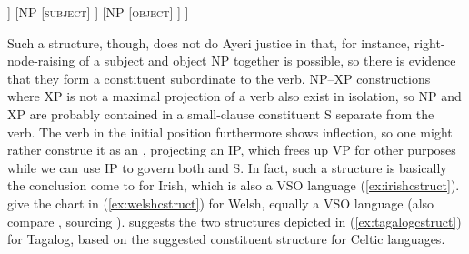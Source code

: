 \ex\label{ex:ayrtreefirsthypo}\ljudge\ques
\begin{forest}
[S
	[V
		[\textsc{verb}]
	]
	[NP
		[\textsc{subject}]
	]
	[NP
		[\textsc{object}]
	]
]
\end{forest}
\xe

Such a structure, though, does not do Ayeri justice in that, for instance,
right-node-raising of a subject and object NP together is possible, so there is
evidence that they form a constituent subordinate to the verb. NP--XP
constructions where XP is not a maximal projection of a verb also exist in
isolation, so NP and XP are probably contained in a small-clause constituent S
separate from the verb. The verb in the initial position furthermore shows
inflection, so one might rather construe it as an , projecting an IP,
which frees up VP for other purposes while we can use IP to govern both
 and S. In fact, such a structure is basically the conclusion
\citet{chungmccloskey1987} come to for Irish, which is also a VSO language
(\ref{ex:irishcstruct}). \citet{bresnan2016} give the chart in
(\ref{ex:welshcstruct}) for Welsh, equally a VSO language (also compare
\cite[66]{dalrymple2001}, sourcing \cite{sadler1997}). \citet{kroeger1991}
suggests the two structures depicted in (\ref{ex:tagalogcstruct}) for Tagalog,
based on the suggested constituent structure for Celtic languages.

